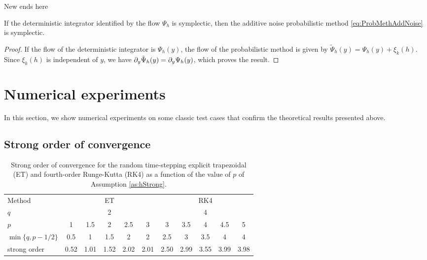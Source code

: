 \documentclass{siamart1116}
\numberwithin{theorem}{section}
\newcommand{\pdv}[2]{\ensuremath\partial_{#2}#1}
\begin{document}
{\color{red} New ends here}

\begin{theorem}\label{thm:SymplecticAddNoise} If the deterministic integrator identified by the flow $\Psi_h$ is symplectic, then the additive noise probabilistic method \eqref{eq:ProbMethAddNoise} is symplectic.
\end{theorem}
\begin{proof} If the flow of the deterministic integrator is $\Psi_h(y)$, the flow of the probabilistic method is given by $\tilde\Psi_h(y) = \Psi_h(y) + \xi_k(h)$. Since $\xi_k(h)$ is independent of $y$, we have $\pdv{\tilde\Psi_h(y)}{y} = \pdv{\Psi_h(y)}{y}$, which proves the result.	
\end{proof}

\section{Numerical experiments}\label{sec:NumericalExperiments}

In this section, we show numerical experiments on some classic test cases that confirm the theoretical results presented above. 

\subsection{Strong order of convergence}

\begin{table}[!t]
	\centering
	\begin{tabular}{lcccccccccc}
		\toprule
		Method & \multicolumn{5}{c}{ET} & \multicolumn{5}{c}{RK4} \\ 
		\cmidrule(l{2pt}r{2pt}){2-6} \cmidrule(l{2pt}r{2pt}){7-11} 
		$q$ & \multicolumn{5}{c}{2} & \multicolumn{5}{c}{4} \\
		$p$ & 1 & 1.5 & 2 & 2.5 & 3 & 3 & 3.5 & 4 & 4.5 & 5\\
		$\min\{q, p - 1/2\}$ & 0.5 & 1 & 1.5 & 2 & 2 & 2.5 & 3 & 3.5 & 4 & 4 \\
		strong order & 0.52 & 1.01 & 1.52 & 2.02 & 2.01 & 2.50 & 2.99 & 3.55 & 3.99 & 3.98 \\
		\bottomrule
	\end{tabular}
	\caption{Strong order of convergence for the random time-stepping explicit trapezoidal (ET) and fourth-order Runge-Kutta (RK4) as a function of the value of $p$ of Assumption \ref{as:hStrong}.}
	\label{tab:NumericalResultsStrongOrder}
\end{table}
\end{document}
